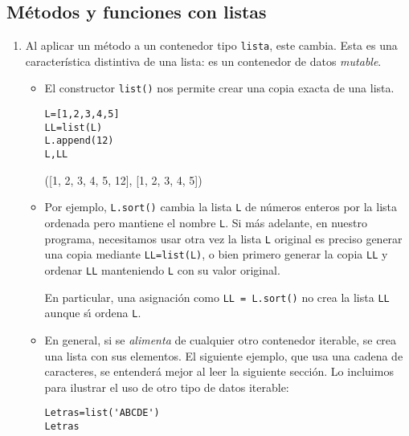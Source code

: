 \subsection{Métodos y funciones con listas}

\begin{enumerate}

\item Al aplicar un método a un contenedor tipo \lstinline|lista|, este cambia.
Esta es una
característica distintiva de una lista: es un contenedor de datos
\emph{mutable}.

\begin{itemize}
\item El constructor \lstinline|list()| nos permite crear una copia exacta de
una lista.
\begin{lstlisting}
L=[1,2,3,4,5]
LL=list(L)
L.append(12)
L,LL
\end{lstlisting}
\begin{Output}
	([1, 2, 3, 4, 5, 12], [1, 2, 3, 4, 5])
\end{Output}

\item Por ejemplo,  \lstinline|L.sort()| cambia la lista \lstinline$L$ de 
n\'umeros
enteros por la lista ordenada pero mantiene el nombre \lstinline$L$. Si m\'as 
adelante, en
nuestro programa,  necesitamos usar otra vez la lista \lstinline$L$ original es 
preciso
generar una copia mediante \lstinline|LL=list(L)|, o bien primero generar la
copia \lstinline$LL$ y ordenar \lstinline$LL$ manteniendo \lstinline$L$ con su 
valor original.

En particular, una asignaci\'on como \lstinline|LL = L.sort()| no crea la lista
\lstinline$LL$ aunque s\'{\i} ordena \lstinline$L$.

\item En general, si se \emph{alimenta} de cualquier otro contenedor iterable,
se crea una
lista con sus elementos. El siguiente ejemplo, que usa una cadena de caracteres,
se
entenderá mejor al leer la siguiente sección. Lo incluimos para ilustrar el uso
de otro
tipo de
datos iterable:
\begin{lstlisting}
Letras=list('ABCDE')
Letras
\end{lstlisting}
\begin{Output}
	['A', 'B', 'C', 'D', 'E']
\end{Output}



\end{itemize}
\end{enumerate}
